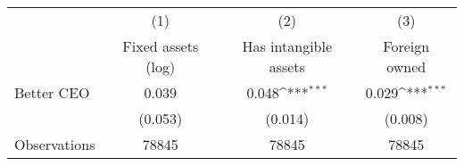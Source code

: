 {
\def\sym#1{\ifmmode^{#1}\else\(^{#1}\)\fi}
\begin{tabular}{l*{3}{c}}
\hline\hline
                    &\multicolumn{1}{c}{(1)}&\multicolumn{1}{c}{(2)}&\multicolumn{1}{c}{(3)}\\
                    &\multicolumn{1}{c}{Fixed assets (log)}&\multicolumn{1}{c}{Has intangible assets}&\multicolumn{1}{c}{Foreign owned}\\
\hline
Better CEO          &       0.039         &       0.048\sym{***}&       0.029\sym{***}\\
                    &     (0.053)         &     (0.014)         &     (0.008)         \\
\hline
Observations        &       78845         &       78845         &       78845         \\
\hline\hline
\end{tabular}
}
